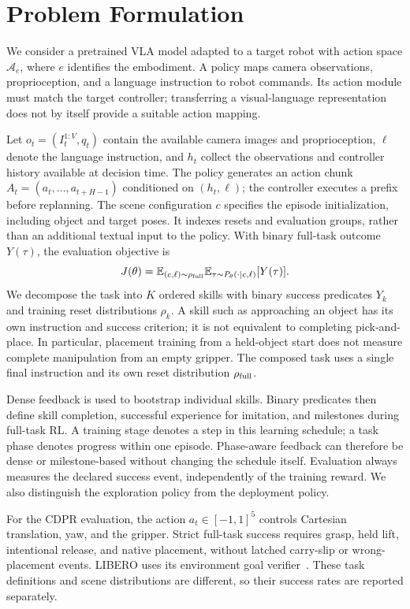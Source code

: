 \section{Problem Formulation}\label{sec:problem}
We consider a pretrained VLA model adapted to a target robot with action space $\mathcal A_e$, where $e$ identifies the embodiment. A policy maps camera observations, proprioception, and a language instruction to robot commands. Its action module must match the target controller; transferring a visual-language representation does not by itself provide a suitable action mapping.

Let $o_t=(I_t^{1:V},q_t)$ contain the available camera images and proprioception, $\ell$ denote the language instruction, and $h_t$ collect the observations and controller history available at decision time. The policy generates an action chunk $A_t=(a_t,\ldots,a_{t+H-1})$ conditioned on $(h_t,\ell)$; the controller executes a prefix before replanning. The scene configuration $c$ specifies the episode initialization, including object and target poses. It indexes resets and evaluation groups, rather than an additional textual input to the policy. With binary full-task outcome $Y(\tau)$, the evaluation objective is
\begin{equation}
J(\theta)=\mathbb{E}_{(c,\ell)\sim\rho_{\rm full}}
\mathbb{E}_{\tau\sim P_\theta(\cdot\mid c,\ell)}[Y(\tau)].
\end{equation}
We decompose the task into $K$ ordered skills with binary success predicates $Y_k$ and training reset distributions $\rho_k$. A skill such as approaching an object has its own instruction and success criterion; it is not equivalent to completing pick-and-place. In particular, placement training from a held-object start does not measure complete manipulation from an empty gripper. The composed task uses a single final instruction and its own reset distribution $\rho_{\rm full}$.

Dense feedback is used to bootstrap individual skills. Binary predicates then define skill completion, successful experience for imitation, and milestones during full-task RL. A training stage denotes a step in this learning schedule; a task phase denotes progress within one episode. Phase-aware feedback can therefore be dense or milestone-based without changing the schedule itself. Evaluation always measures the declared success event, independently of the training reward. We also distinguish the exploration policy from the deployment policy.

For the CDPR evaluation, the action $a_t\in[-1,1]^5$ controls Cartesian translation, yaw, and the gripper. Strict full-task success requires grasp, held lift, intentional release, and native placement, without latched carry-slip or wrong-placement events. LIBERO uses its environment goal verifier~\cite{libero}. These task definitions and scene distributions are different, so their success rates are reported separately.
